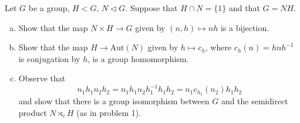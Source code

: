 \documentclass{article}
\newcounter{Problem}
\newenvironment{Problem}{\begin{Exercise}[name={Problem},
                                          counter={Problem}]}
                        {\end{Exercise}}
\begin{document}
\begin{Problem}
Let $G$ be a group, $H < G$, $N \triangleleft G$. Suppose that
$H \cap N = \{ 1 \}$ and that $G = NH$.
\begin{enumerate}[(a)]
  \item{Show that the map $N \times H \to G$ given by
        $(n, h) \mapsto nh$ is a bijection.}
  \item{Show that the map $H \to \mathrm{Aut}(N)$ given by
      $h \mapsto c_h$, where $c_h(n) = h n h^{-1}$ is conjugation by
      $h$, is a group homomorphism.}
  \item{Observe that
        $$
        n_1 h_1 n_2 h_2
      = n_1 h_1 n_2 h_1^{-1} h_1 h_2
      = n_1 c_{h_1}(n_2) h_1 h_2
        $$
        and show that there is a group isomorphism between $G$ and the
        semidirect product $N \rtimes_c H$ (as in problem 1).}
\end{enumerate}
\end{Problem}
\end{document}
